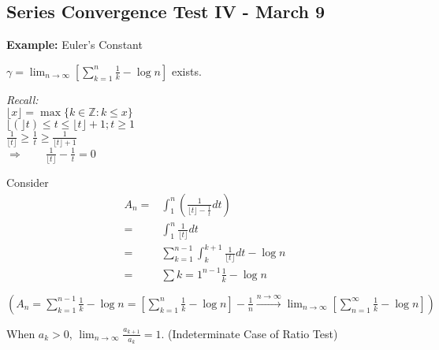\documentclass[12pt]{article}
\theoremstyle{plain}
\newcommand{\floor}[1]{\lfloor #1 \rfloor}
\newcommand{\mZ}{{\mathbb{Z}}}
\begin{document}
\subsection{Series Convergence Test IV - March 9}
{\color{Brown}
\textbf{Example:} Euler's Constant

$\gamma = \lim_{n\to\infty} [\sum_{k=1}^n \frac 1k - \log n]$ exists.

\textit{Recall:} \\
$\floor{x} = \max \{k \in \mZ : k \leq x\}$	\\
$\floor(t) \leq t \leq \floor{t} + 1; t \geq 1$\\
$\frac 1{\floor{t}} \geq \frac 1t \geq \frac 1{\floor{t} + 1}$	\\
$\Rightarrow \qquad \frac 1{\floor{t}} - \frac 1t = 0$

Consider 
\begin{align*}
	A_n 
	=& \int_1^n (\frac1{\floor t - \frac 1t} dt)	\\
	=& \int_1^n \frac1{\floor t} dt	\\
	=& \sum_{k=1}^{n-1} \int_k^{k+1} \frac1{\floor t}dt - \log n	\\
	=& \sum{k=1}^{n-1} \frac 1k - \log n	\\\\
\end{align*}
$(A_n = \sum_{k=1}^{n-1} \frac 1k - \log n = 
[\sum_{k=1}^n \frac 1k - \log n] - \frac 1n 
\overset{n\to\infty}{\longrightarrow} \lim_{n\to\infty} 
[\sum_{n=1}^{\infty} \frac 1k - \log n])$

When $a_k > 0$, $\lim_{n\to\infty} \frac{a_{k+1}}{a_k} = 1$. 
(Indeterminate Case of Ratio Test)	\\
}
\end{document}
